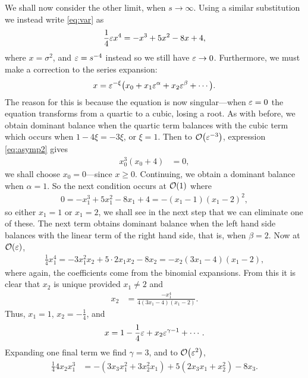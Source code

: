 We shall now consider the other limit, when $s \rightarrow \infty$. Using a similar substitution we instead write \eqref{eq:var} as
\begin{align}
\label{eq:asymp2}
\frac{1}{4} \varepsilon x^4 = -x^3 + 5x^2 - 8x + 4,
\end{align}
where $x = \sigma^2$, and $\varepsilon = s^{-4}$ instead so we still have $\varepsilon \rightarrow 0$. Furthermore, we must make a correction to the series expansion:
\begin{align}
\label{eq:series2}
x = \eps^{-\xi} \left( x_0 + x_1 \eps^\alpha + x_2 \eps^\beta + \cdots \right).
\end{align}
The reason for this is because the equation is now singular---when $\varepsilon=0$ the equation transforms from a quartic to a cubic, losing a root. As with before, we obtain dominant balance when the quartic term balances with the cubic term which occurs when $1 - 4 \xi = -3 \xi$, or $\xi = 1$. Then to $\bigO{\eps^{-3}}$, expression \eqref{eq:asymp2} gives
\begin{align*}
x_0^3 (x_0 + 4) &= 0,
\end{align*}
we shall choose $x_0 = 0$---since $x \geq 0$. Continuing, we obtain a dominant balance when $\alpha = 1$. So the next condition occurs at $\bigO{1}$ where
\begin{align*}
0 = -x_1^3 + 5x_1^2 - 8x_1 + 4 = -(x_1 - 1)(x_1 - 2)^2,
\end{align*}
so either $x_1 = 1$ or $x_1 = 2$, we shall see in the next step that we can eliminate one of these. The next term obtains dominant balance when the left hand side balances with the linear term of the right hand side, that is, when $\beta = 2$. Now at $\bigO{\eps}$,
\begin{align*}
\frac{1}{4} x_1^4 = -3x_1^2 x_2 + 5\cdot2 x_1 x_2 - 8x_2 = -x_2 (3x_1 - 4)(x_1 - 2),
\end{align*}
where again, the coefficients come from the binomial expansions. From this it is clear that $x_2$ is unique provided $x_1 \ne 2$ and
\begin{align*}
x_2 &= \frac{-x_1^4}{4(3x_1 - 4)(x_1 - 2)}.
\end{align*}
Thus, $x_1 = 1$, $x_2 = -\frac{1}{4}$, and
\begin{align*}
x = 1 - \frac{1}{4} \varepsilon + x_2 \varepsilon^{\gamma - 1} + \cdots.
\end{align*}
Expanding one final term we find $\gamma = 3$, and to $\bigO{\eps^2}$,
\begin{align*}
\frac{1}{4} 4x_2 x_1^3 &= -(3x_3 x_1^2 + 3x_2^2 x_1) + 5(2x_3 x_1 + x_2^2) - 8x_3.
\end{align*}
